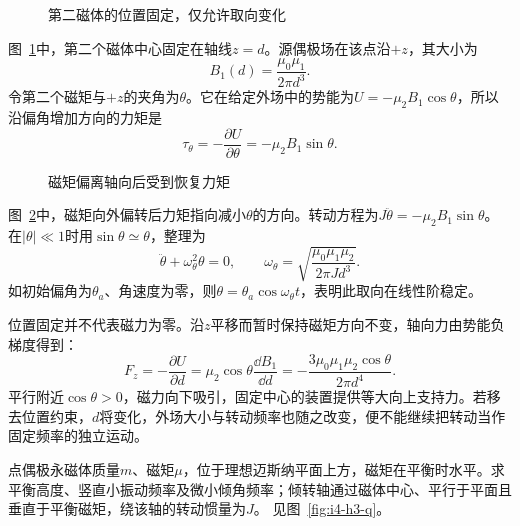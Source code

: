 \begin{figure}[H]\centering
{}
\caption{第二磁体的位置固定，仅允许取向变化}\label{fig:i4-h2-q}
\end{figure}
\begin{solution}
图~\ref{fig:i4-h2-q}中，第二个磁体中心固定在轴线$z=d$。源偶极场在该点沿$+z$，其大小为
\[
B_1(d)=\frac{\mu_0\mu_1}{2\pi d^3}.
\]
令第二个磁矩与$+z$的夹角为$\theta$。它在给定外场中的势能为$U=-\mu_2B_1\cos\theta$，所以沿偏角增加方向的力矩是
\[
\tau_\theta=-\frac{\partial U}{\partial\theta}
=-\mu_2B_1\sin\theta.
\]
\begin{figure}[H]\centering
{}
\caption{磁矩偏离轴向后受到恢复力矩}\label{fig:i4-h2-s}
\end{figure}
图~\ref{fig:i4-h2-s}中，磁矩向外偏转后力矩指向减小$\theta$的方向。转动方程为$J\ddot\theta=-\mu_2B_1\sin\theta$。在$|\theta|\ll1$时用$\sin\theta\simeq\theta$，整理为
\[
\ddot\theta+\omega_\theta^2\theta=0,\qquad
\boxed{\omega_\theta=
\sqrt{\frac{\mu_0\mu_1\mu_2}{2\pi Jd^3}}}.
\]
如初始偏角为$\theta_a$、角速度为零，则$\theta=\theta_a\cos\omega_\theta t$，表明此取向在线性阶稳定。

位置固定并不代表磁力为零。沿$z$平移而暂时保持磁矩方向不变，轴向力由势能负梯度得到：
\[
F_z=-\frac{\partial U}{\partial d}
=\mu_2\cos\theta\frac{\dd B_1}{\dd d}
=\boxed{-\frac{3\mu_0\mu_1\mu_2\cos\theta}{2\pi d^4}}.
\]
平行附近$\cos\theta>0$，磁力向下吸引，固定中心的装置提供等大向上支持力。若移去位置约束，$d$将变化，外场大小与转动频率也随之改变，便不能继续把转动当作固定频率的独立运动。
\end{solution}

\begin{exercise}[水平磁偶极的悬浮与倾角稳定性]\label{ex:i4-h3}
点偶极永磁体质量$m$、磁矩$\mu$，位于理想迈斯纳平面上方，磁矩在平衡时水平。求平衡高度、竖直小振动频率及微小倾角频率；倾转轴通过磁体中心、平行于平面且垂直于平衡磁矩，绕该轴的转动惯量为$J$。 见图~\ref{fig:i4-h3-q}。
\end{exercise}

